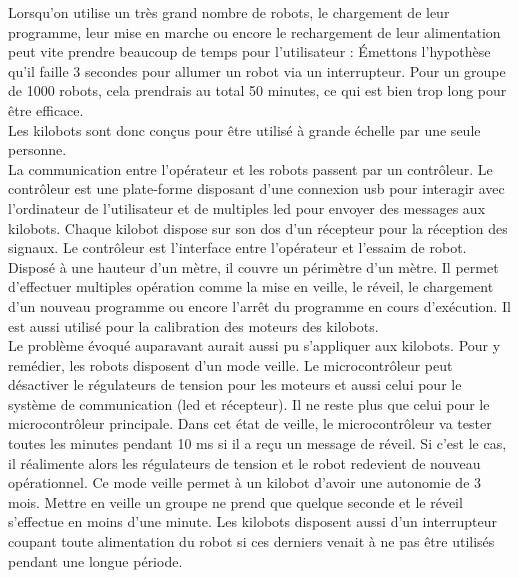 \documentclass[a4paper,8pt]{report}
\begin{document}
Lorsqu'on utilise un tr\`es grand nombre de robots, le chargement de leur programme, leur mise en marche ou encore le rechargement de leur alimentation peut vite prendre beaucoup de temps pour l'utilisateur : \'Emettons l'hypoth\`ese qu'il faille 3 secondes pour allumer un robot via un interrupteur. Pour un groupe de 1000 robots, cela prendrais au total 50 minutes, ce qui est bien trop long pour \^etre efficace. \\
Les kilobots sont donc con\c cus pour \^etre utilis\'e \`a grande \'echelle par une seule personne.\\

\medskip
La communication entre l'op\'erateur et les robots passent par un contr\^oleur. Le contr\^oleur est une plate-forme disposant d'une connexion usb pour interagir avec l'ordinateur de l'utilisateur et de multiples led pour envoyer des messages aux kilobots. Chaque kilobot dispose sur son dos d'un r\'ecepteur pour la r\'eception des signaux. Le contr\^oleur est l'interface entre l'op\'erateur et l'essaim de robot. Dispos\'e \`a une hauteur d'un m\`etre, il couvre un p\'erim\`etre d'un m\`etre. Il permet d'effectuer multiples op\'eration comme la mise en veille, le r\'eveil, le chargement d'un nouveau programme ou encore l'arr\^et du programme en cours d'ex\'ecution. Il est aussi utilis\'e pour la calibration des moteurs des kilobots.\\

\medskip
Le probl\`eme \'evoqu\'e auparavant aurait aussi pu s'appliquer aux kilobots. Pour y rem\'edier, les robots disposent d'un mode veille. Le microcontr\^oleur peut d\'esactiver le r\'egulateurs de tension pour les moteurs et aussi celui pour le syst\`eme de communication (led et r\'ecepteur). Il ne reste plus que celui pour le microcontr\^oleur principale. Dans cet \'etat de veille, le microcontr\^oleur va tester toutes les minutes pendant 10 ms si il a re\c cu un message de r\'eveil. Si c'est le cas, il r\'ealimente alors les r\'egulateurs de tension et le robot redevient de nouveau op\'erationnel. Ce mode veille permet \`a un kilobot d'avoir une autonomie de 3 mois. Mettre en veille un groupe ne prend que quelque seconde et le r\'eveil s'effectue en moins d'une minute. Les kilobots disposent aussi d'un interrupteur coupant toute alimentation du robot si ces derniers venait \`a ne pas \^etre utilis\'es pendant une longue p\'eriode.\\
\end{document}
